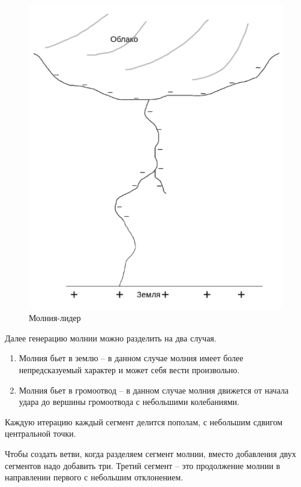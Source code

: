 \begin{figure}[H]
	\begin{center}
		\includegraphics[scale=0.48]{img/m2.png}
	\end{center}
	\captionsetup{justification=centering}
	\caption{Молния-лидер}
	\label{img:m2}
\end{figure}



Далее генерацию молнии можно разделить на два случая.
\begin{enumerate}
	\item Молния бьет в землю – в данном случае молния имеет более непредсказуемый характер и может себя вести произвольно.
	\item Молния бьет в громоотвод – в данном случае молния движется от начала удара до вершины громоотвода с небольшими колебаниями.
\end{enumerate}

Каждую итерацию каждый сегмент делится пополам, с небольшим сдвигом центральной точки.

Чтобы создать ветви, когда разделяем сегмент молнии, вместо добавления двух сегментов надо добавить три. Третий сегмент – это продолжение молнии в направлении первого с небольшим отклонением.

